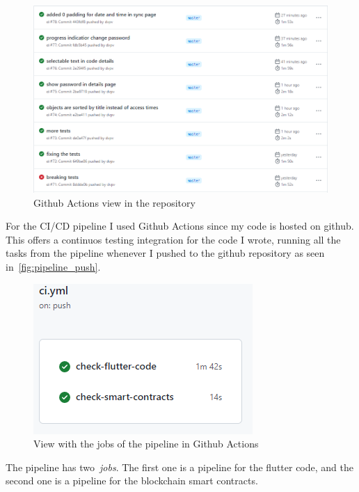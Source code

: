 \documentclass[a4paper,12pt]{report}
\begin{document}
\begin{figure}[H]
    \centering
    \includegraphics[scale=0.6]{images/pipeline/pipeline_push.png}
    \caption{Github Actions view in the repository}\label{fig:pipeline_push}
\end{figure}

For the CI/CD pipeline I used Github Actions since my code is hosted on github.
This offers a continuos testing integration for the code I wrote, running all
the tasks from the pipeline whenever I pushed to the github repository as seen
in~\autoref{fig:pipeline_push}.

\begin{figure}[H]
    \centering
    \includegraphics[scale=0.6]{images/pipeline/pipeline_tasks.png}
    \caption{View with the jobs of the pipeline in Github Actions}\label{fig:pipeline_tasks}
\end{figure}

The pipeline has two~\textit{jobs}. The first one is a pipeline for the flutter
code, and the second one is a pipeline for the blockchain smart contracts.
\end{document}
